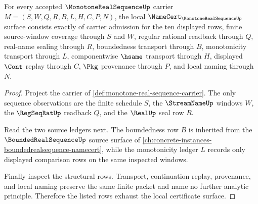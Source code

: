 \begin{theorem}
\label{thm:monotone-real-sequence-namecert-obligations}
For every accepted $\MonotoneRealSequenceUp$ carrier $M=(S,W,Q,R,B,L,H,C,P,N)$, the local $\NameCert_{\MonotoneRealSequenceUp}$ surface consists exactly of carrier admission for the ten displayed rows, finite source-window coverage through $S$ and $W$, regular rational readback through $Q$, real-name sealing through $R$, boundedness transport through $B$, monotonicity transport through $L$, componentwise $\hsame$ transport through $H$, displayed $\Cont$ replay through $C$, $\Pkg$ provenance through $P$, and local naming through $N$.
\end{theorem}
\begin{proof}
Project the carrier of \autoref{def:monotone-real-sequence-carrier}. The only sequence observations are the finite schedule $S$, the $\StreamNameUp$ windows $W$, the $\RegSeqRatUp$ readback $Q$, and the $\RealUp$ seal row $R$.

Read the two source ledgers next. The boundedness row $B$ is inherited from the $\BoundedRealSequenceUp$ source surface of \autoref{ch:concrete-instances-boundedrealsequence-namecert}, while the monotonicity ledger $L$ records only displayed comparison rows on the same inspected windows.

Finally inspect the structural rows. Transport, continuation replay, provenance, and local naming preserve the same finite packet and name no further analytic principle. Therefore the listed rows exhaust the local certificate surface.
\end{proof}


